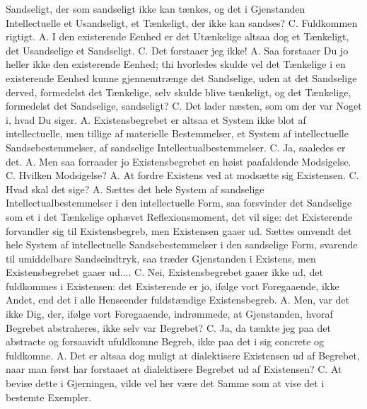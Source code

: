 \documentclass[12pt,a4paper]{book}
\begin{document}
Sandseligt, der som sandseligt ikke kan tænkes, og det i Gjenstanden
Intellectuelle et Usandseligt, et Tænkeligt, der ikke kan sandses?
C. Fuldkommen rigtigt. A. I den existerende Eenhed er det Utænkelige
altsaa dog et Tænkeligt, det Usandselige et Sandseligt. C. Det
forstaaer jeg ikke! A. Saa forstaaer Du jo heller ikke den existerende
Eenhed; thi hvorledes skulde vel det Tænkelige i en existerende Eenhed
kunne gjennemtrænge det Sandselige, uden at det Sandselige derved,
formedelst det Tænkelige, selv skulde blive tænkeligt, og det Tænkelige,
formedelst det Sandselige, sandseligt? C. Det lader næsten, som om der
var Noget i, hvad Du siger. A. Existensbegrebet er altsaa et System
ikke blot af intellectuelle, men tillige af materielle Bestemmelser, et
System af intellectuelle Sandsebestemmelser, af sandselige
Intellectualbestemmelser. C. Ja, saaledes er det. A. Men saa
forraader jo Existensbegrebet en høist paafaldende Modsigelse.
C. Hvilken Modsigelse? A. At fordre Existens ved at modsætte sig
Existensen. C. Hvad skal det sige? A. Sættes det hele System af
sandselige Intellectualbestemmelser i den intellectuelle Form, saa
forsvinder det Sandselige som et i det Tænkelige ophævet
Reflexionsmoment, det vil sige: det Existerende forvandler sig til
Existensbegreb, men Existensen gaaer ud. Sættes omvendt det hele System
af intellectuelle Sandsebestemmelser i den sandselige Form, svarende til
umiddelbare Sandseindtryk, saa træder Gjenstanden i Existens, men
Existensbegrebet gaaer ud.... C. Nei, Existensbegrebet gaaer ikke ud,
det fuldkommes
i Existensen: det Existerende er jo, ifølge vort Foregaaende, ikke
Andet, end det i alle Henseender fuldstændige Existensbegreb. A. Men,
var det ikke Dig, der, ifølge vort Foregaaende, indrømmede, at
Gjenstanden, hvoraf Begrebet abstraheres, ikke selv var Begrebet?
C. Ja, da tænkte jeg paa det abstracte og forsaavidt ufuldkomne Begreb,
ikke paa det i sig concrete og fuldkomne. A. Det er altsaa dog muligt
at dialektisere Existensen ud af Begrebet, naar man først har forstaaet
at dialektisere Begrebet ud af Existensen? C. At bevise dette i
Gjerningen, vilde vel her være det Samme som at vise det i bestemte
Exempler.
\end{document}
